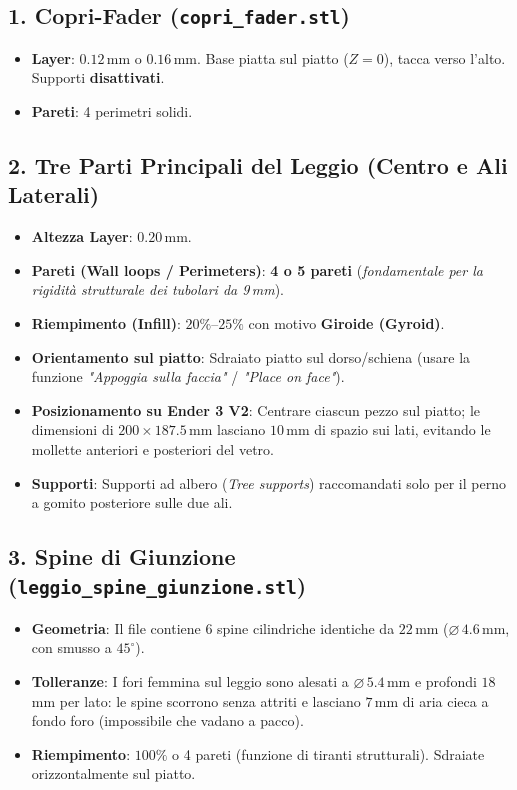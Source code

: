 \documentclass[11pt,a4paper]{article}
\begin{document}
\subsection{1. Copri-Fader (\texttt{copri\_fader.stl})}
\begin{itemize}
    \item \textbf{Layer}: $0.12$\,mm o $0.16$\,mm. Base piatta sul piatto ($Z=0$), tacca verso l'alto. Supporti \textbf{disattivati}.
    \item \textbf{Pareti}: 4 perimetri solidi.
\end{itemize}

\subsection{2. Tre Parti Principali del Leggio (Centro e Ali Laterali)}
\begin{itemize}
    \item \textbf{Altezza Layer}: $0.20$\,mm.
    \item \textbf{Pareti (Wall loops / Perimeters)}: \textbf{4 o 5 pareti} (\textit{fondamentale per la rigidità strutturale dei tubolari da 9\,mm}).
    \item \textbf{Riempimento (Infill)}: $20\%$--$25\%$ con motivo \textbf{Giroide (Gyroid)}.
    \item \textbf{Orientamento sul piatto}: Sdraiato piatto sul dorso/schiena (usare la funzione \textit{"Appoggia sulla faccia"} / \textit{"Place on face"}).
    \item \textbf{Posizionamento su Ender 3 V2}: Centrare ciascun pezzo sul piatto; le dimensioni di $200 \times 187.5$\,mm lasciano $10$\,mm di spazio sui lati, evitando le mollette anteriori e posteriori del vetro.
    \item \textbf{Supporti}: Supporti ad albero (\textit{Tree supports}) raccomandati solo per il perno a gomito posteriore sulle due ali.
\end{itemize}

\subsection{3. Spine di Giunzione (\texttt{leggio\_spine\_giunzione.stl})}
\begin{itemize}
    \item \textbf{Geometria}: Il file contiene 6 spine cilindriche identiche da $22$\,mm ($\varnothing\,4.6$\,mm, con smusso a $45^\circ$).
    \item \textbf{Tolleranze}: I fori femmina sul leggio sono alesati a $\varnothing\,5.4$\,mm e profondi $18$\,mm per lato: le spine scorrono senza attriti e lasciano $7$\,mm di aria cieca a fondo foro (impossibile che vadano a pacco).
    \item \textbf{Riempimento}: $100\%$ o 4 pareti (funzione di tiranti strutturali). Sdraiate orizzontalmente sul piatto.
\end{itemize}
\end{document}
